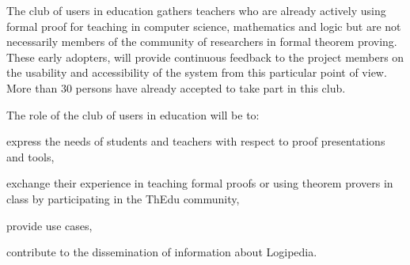 \begin{workpackage}[id=dissemination,type=MGT,wphases=1-48,
  short={Dissemination},
  title={Dissemination, communication and exploitation},
  lead=Lie,LieRM=3,InrRM=6,BirRM=4,CleRM=2,ImtRM=2,StrRM=2,ZibRM=14,EduRM=12]
\begin{tasklist}
  \begin{task}[id=teachers-club,
      title=Expanding the use of Logipedia in education,
      shorttitle=Educ.,
      lead=Str,StrRM=2,wphases=1-48!.05]
    The club of users in education gathers
    teachers who are already actively using formal proof for teaching
    in computer science, mathematics and logic but are not necessarily
    members of the community of researchers in formal theorem
    proving. These early adopters, will provide continuous feedback to
    the project members on the usability and accessibility of the
    system from this particular point of view.  More than 30 persons
    have already accepted to take part in this club.



    The role of the club of users in education will be to:
    \begin{compactitem}
    \item express the needs of students and teachers with respect to proof
      presentations and tools,
    \item exchange their experience in teaching formal proofs or using
      theorem provers in class by participating in the ThEdu community,
    \item provide use cases,
    \item contribute to the dissemination of information about Logipedia.
    \end{compactitem}


\end{task}
\end{tasklist}
\end{workpackage}
